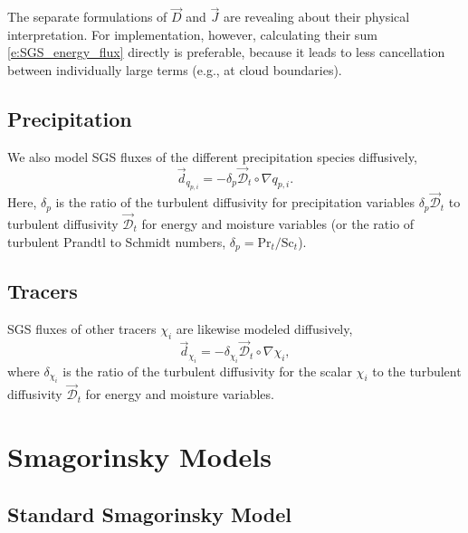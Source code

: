 \documentclass{report}
\begin{document}
The separate formulations of $\vec{D}$ and $\vec{J}$ are revealing about their physical interpretation. For implementation, however, calculating their sum \eqref{e:SGS_energy_flux} directly is preferable, because it leads to less cancellation between individually large terms (e.g., at cloud boundaries).

\subsection{Precipitation}

We also model SGS fluxes of the different precipitation species diffusively,
\begin{equation}\label{eq:sgs-precip-flux}
\vec{d}_{q_{p, i}} = - \delta_p \vec{\mathcal{D}}_t \circ \nabla q_{p, i}.
\end{equation}
Here, $\delta_p$ is the ratio of the turbulent diffusivity for precipitation variables $\delta_p \vec{\mathcal{D}}_t$ to turbulent diffusivity $\vec{\mathcal{D}}_t$ for energy and moisture variables (or the ratio of turbulent Prandtl to Schmidt numbers, $\delta_p = \mathrm{Pr}_t/\mathrm{Sc}_t$). 

\subsection{Tracers}

SGS fluxes of other tracers $\chi_i$ are likewise modeled diffusively,
\begin{equation}\label{eq:sgs-tracer-flux}
\vec{d}_{\chi_i} = - \delta_{\chi_i} \vec{\mathcal{D}}_t \circ \nabla \chi_i,
\end{equation}
where $\delta_{\chi_i}$ is the ratio of the turbulent diffusivity for the scalar $\chi_i$ to the turbulent diffusivity $\vec{\mathcal{D}}_t$ for energy and moisture variables.

\section{Smagorinsky Models}

\subsection{Standard Smagorinsky Model}
\end{document}
